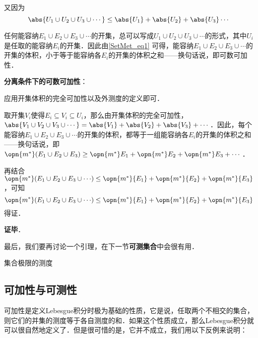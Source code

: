 又因为
\begin{equation}\label{SetMet_eq1}
\abs{U_1\cup U_2\cup U_3\cup \cdots} \leq \abs{U_1}+\abs{U_2}+\abs{U_3}\cdots
\end{equation}

任何能容纳$E_1\cup E_2\cup E_3\cup \cdots $的开集，总可以写成$U_1\cup U_2\cup U_3\cup \cdots$的形式，其中$U_i$是任取的能容纳$E_i$的开集．因此由\autoref{SetMet_eq1} 可得，能容纳$E_1\cup E_2\cup E_3\cup \cdots $的开集的体积，小于等于能容纳各$E_i$的开集的体积之和——换句话说，即可数可加性．

\textbf{分离条件下的可数可加性}：

应用开集体积的完全可加性以及外测度的定义即可．

取开集$V_i$使得$E_i\subseteq V_i\subseteq U_i$，那么由开集体积的完全可加性，$\abs{V_1\cup V_2\cup V_3\cup \cdots}=\abs{V_1}+\abs{V_2}+\abs{V_3}+\cdots$．因此，每个能容纳$E_1\cup E_2\cup E_3\cup\cdots$的开集的体积，都等于一组能容纳各$E_i$的开集的体积之和——换句话说，即$\opn{m^*}(E_1\cup E_2\cup E_3)\geq\opn{m^*}E_1+\opn{m^*}E_2+\opn{m^*}E_3+\cdots$．

再结合$\opn{m^*}({E_1\cup E_2\cup E_3\cup \cdots})\leq \opn{m^*}{E_1}+\opn{m^*}{E_2}+\opn{m^*}{E_3}$，可知
\begin{equation}
\opn{m^*}({E_1\cup E_2\cup E_3\cup \cdots})\leq \opn{m^*}{E_1}+\opn{m^*}{E_2}+\opn{m^*}{E_3}
\end{equation}
得证．

\textbf{证毕}．

最后，我们要再讨论一个引理，在下一节\textbf{可测集合}中会很有用．

\begin{lemma}{集合极限的测度}\label{SetMet_lem1}



\end{lemma}

\subsection{可加性与可测性}

可加性是定义Lebesgue积分时极为基础的性质，它是说，任取两个不相交的集合，则它们的并集的测度等于各自测度的和．如果这个性质成立，那么Lebesgue积分就可以很自然地定义了．但是很可惜的是，它并不成立，我们用以下反例来说明：

